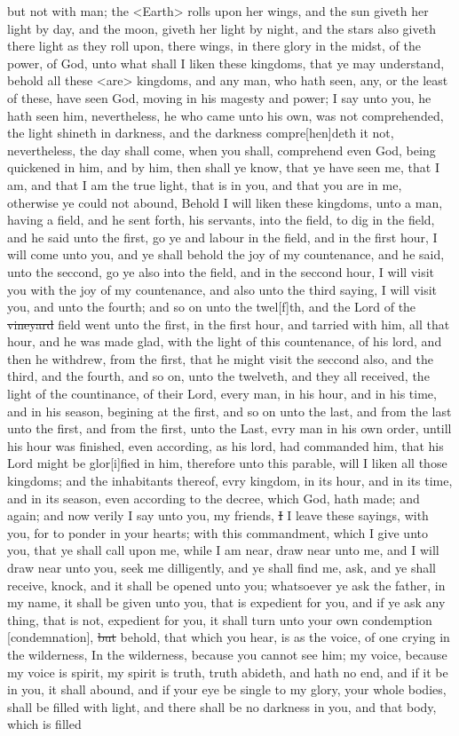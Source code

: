 but not with man; the <Earth> rolls upon her wings, and the sun giveth her light by day, and the moon, giveth her light by night, and the stars also giveth there light as they roll upon, there wings, in there glory in the midst, of the power, of God, unto what shall I liken these kingdoms, that ye may understand, behold all these <are> kingdoms, and any man, who hath seen, any, or the least of these, have seen God, moving in his magesty and power; I say unto you, he hath seen him, nevertheless, he who came unto his own, was not comprehended, the light shineth in darkness, and the darkness compre[hen]deth it not, nevertheless, the day shall come, when you shall, comprehend even God, being quickened in him, and by him, then shall ye know, that ye have seen me, that I am, and that I am the true light, that is in you, and that you are in me, otherwise ye could not abound, Behold I will liken these kingdoms, unto a man, having a field, and he sent forth, his servants, into the field, to dig in the field, and he said unto the first, go ye and labour in the field, and in the first hour, I will come unto you, and ye shall behold the joy of my countenance, and he said, unto the seccond, go ye also into the field, and in the seccond hour, I will visit you with the joy of my countenance, and also unto the third saying, I will visit you, and unto the fourth; and so on unto the twel[f]th, and the Lord of the \sout{vineyard} field went unto the first, in the first hour, and tarried with him, all that hour, and he was made glad, with the light of this countenance, of his lord, and then he withdrew, from the first, that he might visit the seccond also, and the third, and the fourth, and so on, unto the twelveth, and they all received, the light of the countinance, of their Lord, every man, in his hour, and in his time, and in his season, begining at the first, and so on unto the last, and from the last unto the first, and from the first, unto the Last, evry man in his own order, untill his hour was finished, even according, as his lord, had commanded him, that his Lord might be glor[i]fied in him, therefore unto this parable, will I liken all those kingdoms; and the inhabitants thereof, evry kingdom, in its hour, and in its time, and in its season, even according to the decree, which God, hath made; and again; and now verily I say unto you, my friends, \sout{I} I leave these sayings, with you, for to ponder in your hearts; with this commandment, which I give unto you, that ye shall call upon me, while I am near, draw near unto me, and I will draw near unto you, seek me dilligently, and ye shall find me, ask, and ye shall receive, knock, and it shall be opened unto you; whatsoever ye ask the father, in my name, it shall be given unto you, that is expedient for you, and if ye ask any thing, that is not, expedient for you, it shall turn unto your own condemption [condemnation], \sout{but} behold, that which you hear, is as the voice, of one crying in the wilderness, In the wilderness, because you cannot see him; my voice, because my voice is spirit, my spirit is truth, truth abideth, and hath no end, and if it be in you, it shall abound, and if your eye be single to my glory, your whole bodies, shall be filled with light, and there shall be no darkness in you, and that body, which is filled 
